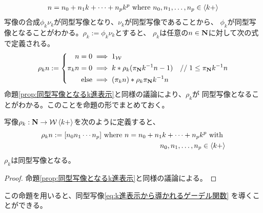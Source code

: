 	\begin{equation*}\begin{split}
		n = n_0 + n_1k + \cdots + n_pk^p
		\text{ where }n_0,n_1,\dots,n_p\in\mathinner{\langle{k+}\rangle}
	\end{split}\end{equation*}
	写像の合成$\phi_k\nu_k$が同型写像となり、$\nu_k$が同型写像であることから、
	$\phi_k$が同型写像となることがわかる。$\rho_k:=\phi_k\nu_k$とすると、
	$\rho_k$は任意の$n\in\mathbf{N}$に対して次の式で定義される。
	\begin{equation*}\begin{split}
		\rho_k n := \left\{\begin{split}
			n = 0 &\implies 1_\Word \\
			\pi_kn = 0 &\implies k * \rho_k(\pi_\sizen k^{-1}n - 1)
				\quad //\; 1\le \pi_\sizen k^{-1}n  \\
			\text{else} &\implies (\pi_kn) * \rho_k\pi_\sizen k^{-1}n \\
		\end{split}\right. %
	\end{split}\end{equation*}
	命題\ref{prop:同型写像となるk進表示}と同様の議論により、$\rho_k$が
	同型写像となることがわかる。このことを命題の形でまとめておく。

	\begin{proposition}[同型写像となるk進表示その二]
	\label{prop:同型写像となるk進表示その二} %
		写像$\rho_k:\mathbf{N}\to{\ensuremath{{\mathcal{W}}}}\mathinner{\langle{k+}\rangle}$を次のように定義すると、
		\begin{equation*}\begin{split}
			\rho_k n := [n_0n_1\cdots n_p] \text{ where }
			n = n_0 + n_1k + \cdots + n_pk^p \text{ with } \\
			n_0,n_1,\dots,n_p\in\mathinner{\langle{k+}\rangle}
		\end{split}\end{equation*}
		$\rho_k$は同型写像となる。
	\end{proposition} %
	\begin{proof} 命題\ref{prop:同型写像となるk進表示}と同様の議論による。
	\end{proof}

	この命題を用いると、同型写像\eqref{eq:k進表示から導かれるゲーデル関数}
	を導くことができる。


